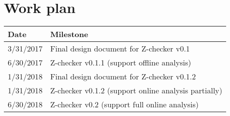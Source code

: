 \section{Work plan}

\begin{tabular}{|p{0.7in}|p{5.5in}|}\hline
\textbf{Date}  & \textbf{Milestone} \\\hline
3/31/2017 & Final design document for Z-checker v0.1 \\\hline
6/30/2017 & Z-checker v0.1.1 (support offline analysis)\\\hline
1/31/2018 & Final design document for Z-checker v0.1.2 \\\hline
1/31/2018 & Z-checker v0.1.2 (support online analysis partially)\\\hline
6/30/2018 & Z-checker v0.2 (support full online analysis) \\\hline
\end{tabular}
